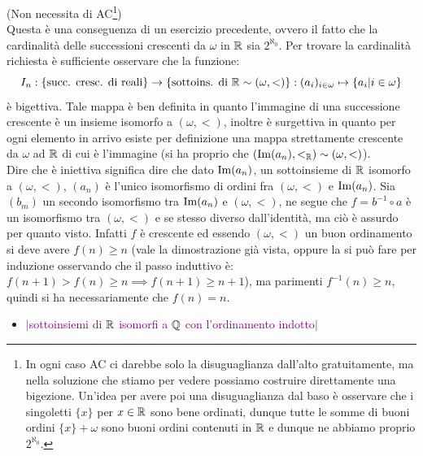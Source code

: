 \begin{soln}
	(Non necessita di AC\footnote{In ogni caso AC ci darebbe solo la disuguaglianza dall'alto gratuitamente, ma nella soluzione che stiamo per vedere possiamo costruire direttamente una bigezione. Un'idea per avere poi una disuguaglianza dal baso \`e osservare che i singoletti $\{x\}$ per $x \in \mathbb R$ sono bene ordinati, dunque tutte le somme di buoni ordini $\{x\} + \omega$ sono buoni ordini contenuti in $\mathbb R$ e dunque ne abbiamo proprio $2^{\aleph_0}$.})\\
	Questa \`e una conseguenza di un esercizio precedente, ovvero il fatto che la cardinalit\`a delle successioni crescenti da $\omega$ in $\mathbb R$ sia $2^{\aleph_0}$. Per trovare la cardinalit\`a richiesta \`e sufficiente osservare che la funzione:
	\[ I_n : \{\text{succ. cresc. di reali}\} \to \{\text{sottoins. di $\mathbb R \sim (\omega,<)$}\} : (a_i)_{i \in \omega} \mapsto \{a_i | i \in \omega\}
		\]
	\`e bigettiva. Tale mappa \`e ben definita in quanto l'immagine di una successione crescente \`e un insieme isomorfo a $(\omega,<)$, inoltre \`e surgettiva in quanto per ogni elemento in arrivo esiste per definizione una mappa strettamente crescente da $\omega$ ad $\mathbb R$ di cui \`e l'immagine (si ha proprio che $(\operatorname{Im}(a_n),<_{\mathbb R}) \sim (\omega,<)$).\\
	Dire che \`e iniettiva significa dire che dato $\operatorname{Im}(a_n)$, un sottoinsieme di $\mathbb R$ isomorfo a $(\omega,<)$, $(a_n)$ \`e l'unico isomorfismo di ordini fra $(\omega,<)$ e $\operatorname{Im}(a_n)$. Sia $(b_m)$ un secondo isomorfismo tra $\operatorname{Im}(a_n)$ e $(\omega,<)$, ne segue che $f = b^{-1} \circ a$ \`e un isomorfismo tra $(\omega,<)$ e se stesso diverso dall'identit\`a, ma ci\`o \`e assurdo per quanto visto.
	Infatti $f$ \`e crescente ed essendo $(\omega,<)$ un buon ordinamento si deve avere $f(n) \geq n$ (vale la dimostrazione gi\`a vista, oppure la si pu\`o fare per induzione osservando che il passo induttivo \`e: $f(n+1) > f(n) \geq n \implies f(n+1) \geq n+1$), ma parimenti $f^{-1}(n) \geq n$, quindi si ha necessariamente che $f(n) = n$.
\end{soln}

\begin{itemize}
	\item \textcolor{purple}{$|$sottoinsiemi di $\mathbb R$ isomorfi a $\mathbb Q$ con l'ordinamento indotto$|$}
\end{itemize}


